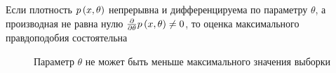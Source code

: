\begin{theorem}
  Если плотность $p\left(x,\theta\right)$
  непрерывна и дифференцируема по параметру $\theta$,
  а производная не равна нулю
  $\frac{\partial}{\partial\theta}p\left(x,\theta\right)\neq 0$,
  то оценка максимального правдоподобия состоятельна
\end{theorem}

\begin{figure}[h!]
  \center
  \caption{Параметр $\theta$ не может быть меньше максимального значения
    выборки}
  \label{fig:tikz:exampleMaximumLikelihoodEstimator}
\end{figure}
